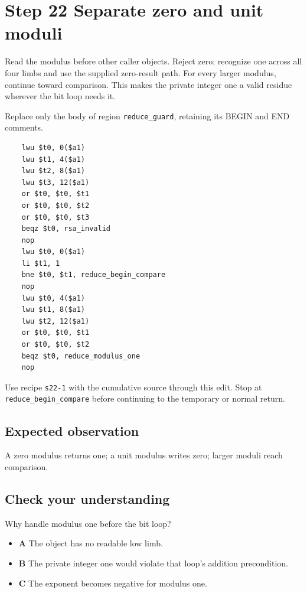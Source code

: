 \section{Step 22 Separate zero and unit moduli}\label{rsa-s22}

Read the modulus before other caller objects. Reject zero; recognize one across all four limbs and use the supplied zero-result path. For every larger modulus, continue toward comparison. This makes the private integer one a valid residue wherever the bit loop needs it.

Replace only the body of region \texttt{reduce\_guard}, retaining its BEGIN and END comments.

\begin{verbatim}
    lwu $t0, 0($a1)
    lwu $t1, 4($a1)
    lwu $t2, 8($a1)
    lwu $t3, 12($a1)
    or $t0, $t0, $t1
    or $t0, $t0, $t2
    or $t0, $t0, $t3
    beqz $t0, rsa_invalid
    nop
    lwu $t0, 0($a1)
    li $t1, 1
    bne $t0, $t1, reduce_begin_compare
    nop
    lwu $t0, 4($a1)
    lwu $t1, 8($a1)
    lwu $t2, 12($a1)
    or $t0, $t0, $t1
    or $t0, $t0, $t2
    beqz $t0, reduce_modulus_one
    nop
\end{verbatim}

Use recipe \texttt{s22-1} with the cumulative source through this edit. Stop at \texttt{reduce\_begin\_compare} before continuing to the temporary or normal return.

\subsection{Expected observation}
A zero modulus returns one; a unit modulus writes zero; larger moduli reach comparison.

\subsection{Check your understanding}
Why handle modulus one before the bit loop?

\begin{itemize}
  \item \textbf{A} The object has no readable low limb.
  \item \textbf{B} The private integer one would violate that loop's addition precondition.
  \item \textbf{C} The exponent becomes negative for modulus one.
\end{itemize}
